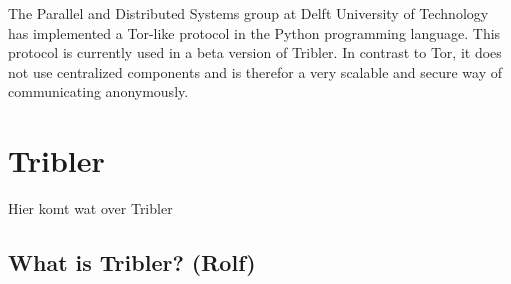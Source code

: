 \documentclass[11pt]{article}
\begin{document}
	The Parallel and Distributed Systems group at Delft University of Technology has implemented a Tor-like protocol in the Python programming language. This protocol is currently used in a beta version of Tribler. In contrast to Tor, it does not use centralized components and is therefor a very scalable and secure way of communicating anonymously.

\section{Tribler}
Hier komt wat over Tribler

\subsection{What is Tribler? (Rolf)}
\end{document}
